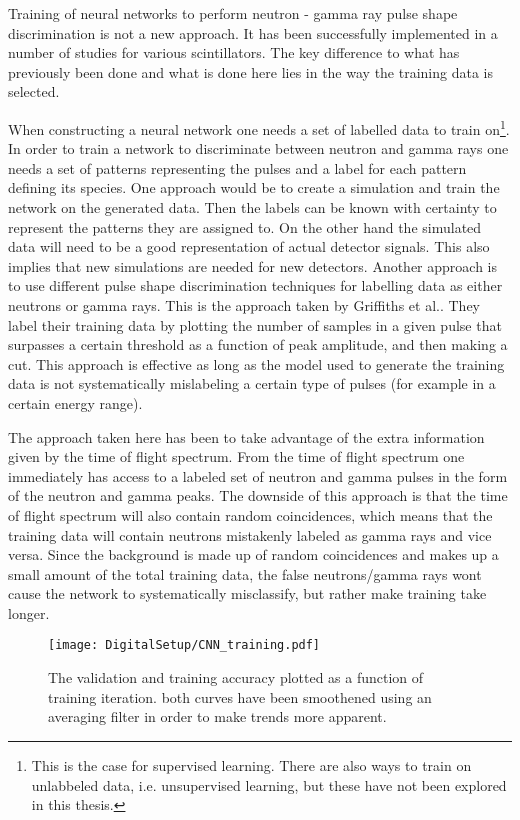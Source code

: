 \documentclass[main.tex]{subfiles}
\begin{document}
Training of neural networks to perform neutron - gamma ray pulse shape discrimination is not a new approach. It has been successfully implemented in a number of studies for various scintillators. The key difference to what has previously been done and what is done here lies in the way the training data is selected.

When constructing a neural network one needs a set of labelled data to train on\footnote{This is the case for supervised learning. There are also ways to train on unlabbeled data, i.e. unsupervised learning, but these have not been explored in this thesis.}. In order to train a network to discriminate between neutron and gamma rays one needs a set of patterns representing the pulses and a label for each pattern defining its species. One approach would be to create a simulation and train the network on the generated data. Then the labels can be known with certainty to represent the patterns they are assigned to. On the other hand the simulated data will need to be a good representation of actual detector signals. This also implies that new simulations are needed for new detectors. Another approach is to use different pulse shape discrimination techniques for labelling data as either neutrons or gamma rays. This is the approach taken by  Griffiths et al.\cite{Griffiths}. They label their training data by plotting the number of samples in a given pulse that surpasses a certain threshold as a function of peak amplitude, and then making a cut. This approach is effective as long as the model used to generate the training data is not systematically mislabeling a certain type of pulses (for example in a certain energy range). 

The approach taken here has been to take advantage of the extra information given by the time of flight spectrum. From the time of flight spectrum one immediately has access to a labeled set of neutron and gamma pulses in the form of the neutron and gamma peaks. The downside of this approach is that the time of flight spectrum will also contain random coincidences, which means that the training data will contain neutrons mistakenly labeled as gamma rays and vice versa. Since the background is made up of random coincidences and makes up a small amount of the total training data, the false neutrons/gamma rays wont cause the network to systematically misclassify, but rather make training take longer.

\begin{figure}[ht!]
    \centering
        \texttt{[image: DigitalSetup/CNN\_training.pdf]}
        \caption[Training and validation accuracy of the CNN]{The validation and training accuracy plotted as a function of training iteration. both curves have been smoothened using an averaging filter in order to make trends more apparent.}
    \label{fig:CNN_training} 
\end{figure}
\end{document}
